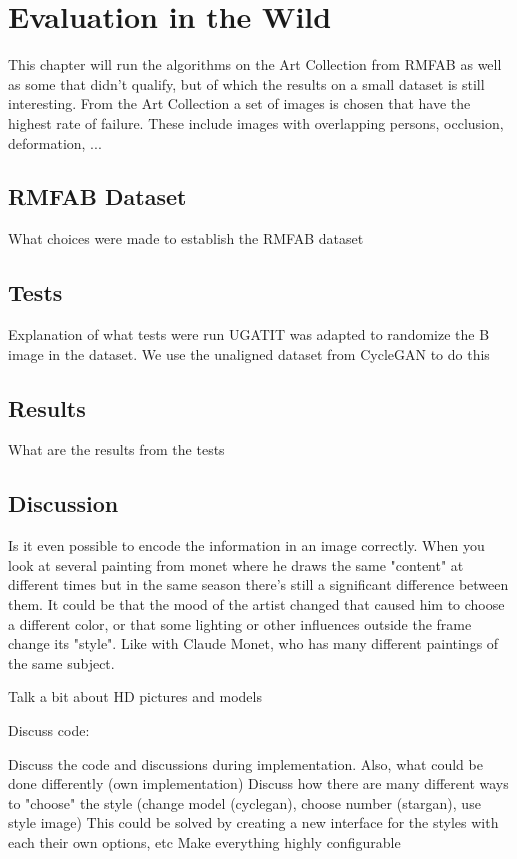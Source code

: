 \chapter{Evaluation in the Wild}
This chapter will run the algorithms on the Art Collection from \gls{RMFAB}
as well as some that didn't qualify, but of which the results on a small dataset is still interesting.
From the Art Collection a set of images is chosen that have the highest rate of failure.
These include images with overlapping persons, occlusion, deformation, ...

\section{RMFAB Dataset}
What choices were made to establish the RMFAB dataset

\section{Tests}

Explanation of what tests were run
UGATIT was adapted to randomize the B image in the dataset.
We use the unaligned dataset from CycleGAN to do this

\section{Results}
What are the results from the tests

\section{Discussion}
Is it even possible to encode the information in an image correctly.
When you look at several painting from monet where he draws the same "content" at different times but in the same season there's still a significant difference between them.
It could be that the mood of the artist changed that caused him to choose a different color, or that some lighting or other influences outside the frame change its "style".
Like with Claude Monet, who has many different paintings of the same subject.

Talk a bit about HD pictures and models


Discuss code:

Discuss the code and discussions during implementation.
Also, what could be done differently (own implementation)
Discuss how there are many different ways to "choose" the style (change model (cyclegan), choose number (stargan), use style image)
This could be solved by creating a new interface for the styles with each their own options, etc 
Make everything highly configurable

